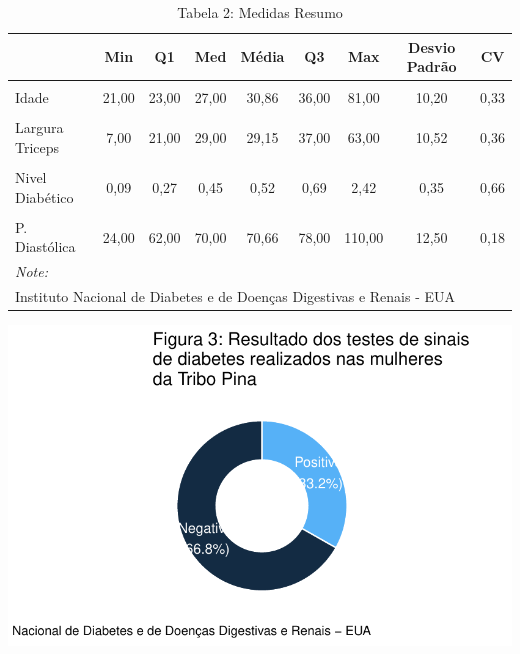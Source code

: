 \documentclass[
  letterpaper,
  DIV=11,
  numbers=noendperiod]{scrartcl}
\begin{document}
\begin{table}

\caption{Tabela 2: Medidas Resumo}
\centering
\begin{tabular}[t]{l|c|c|c|c|c|c|c|c}
\hline
  & Min & Q1 & Med & Média & Q3 & Max & Desvio Padrão & CV\\
\hline
\cellcolor{TRUE}{Glicose} & \cellcolor{TRUE}{56,00} & \cellcolor{TRUE}{99,00} & \cellcolor{TRUE}{119,00} & \cellcolor{TRUE}{122,63} & \cellcolor{TRUE}{143,00} & \cellcolor{TRUE}{198,00} & \cellcolor{TRUE}{30,86} & \cellcolor{TRUE}{0,25}\\
\hline
Idade & 21,00 & 23,00 & 27,00 & 30,86 & 36,00 & 81,00 & 10,20 & 0,33\\
\hline
\cellcolor{TRUE}{IMC} & \cellcolor{TRUE}{18,20} & \cellcolor{TRUE}{28,40} & \cellcolor{TRUE}{33,20} & \cellcolor{TRUE}{33,09} & \cellcolor{TRUE}{37,10} & \cellcolor{TRUE}{67,10} & \cellcolor{TRUE}{7,03} & \cellcolor{TRUE}{0,21}\\
\hline
Largura Triceps & 7,00 & 21,00 & 29,00 & 29,15 & 37,00 & 63,00 & 10,52 & 0,36\\
\hline
\cellcolor{TRUE}{N° de Gestações} & \cellcolor{TRUE}{0,00} & \cellcolor{TRUE}{1,00} & \cellcolor{TRUE}{2,00} & \cellcolor{TRUE}{3,30} & \cellcolor{TRUE}{5,00} & \cellcolor{TRUE}{17,00} & \cellcolor{TRUE}{3,21} & \cellcolor{TRUE}{0,97}\\
\hline
Nivel Diabético & 0,09 & 0,27 & 0,45 & 0,52 & 0,69 & 2,42 & 0,35 & 0,66\\
\hline
\cellcolor{TRUE}{Nível Insulina} & \cellcolor{TRUE}{14,00} & \cellcolor{TRUE}{76,50} & \cellcolor{TRUE}{125,50} & \cellcolor{TRUE}{156,06} & \cellcolor{TRUE}{190,00} & \cellcolor{TRUE}{846,00} & \cellcolor{TRUE}{118,84} & \cellcolor{TRUE}{0,76}\\
\hline
P. Diastólica & 24,00 & 62,00 & 70,00 & 70,66 & 78,00 & 110,00 & 12,50 & 0,18\\
\hline
\multicolumn{9}{l}{\rule{0pt}{1em}\textit{Note: }}\\
\multicolumn{9}{l}{\rule{0pt}{1em}Instituto Nacional de Diabetes e de Doenças Digestivas e Renais - EUA}\\
\end{tabular}
\end{table}

\includegraphics{relatorio_lab1_files/figure-pdf/unnamed-chunk-6-1.pdf}
\end{document}
